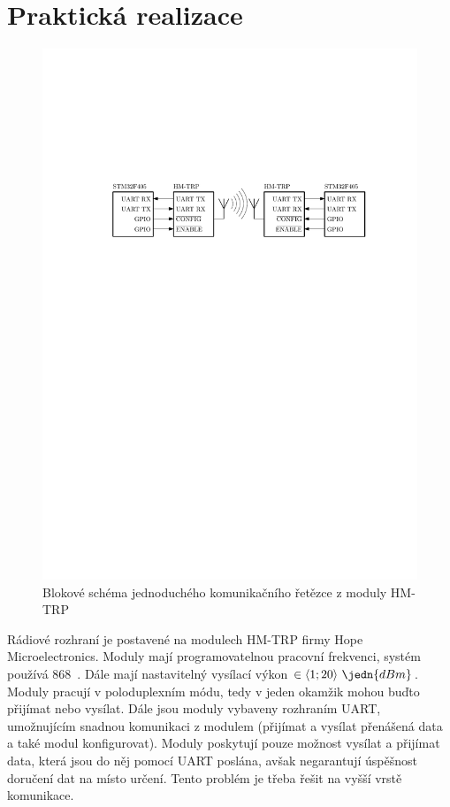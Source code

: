 \section{Praktická realizace}
\begin{figure}[H]
    \begin{center}
        \includegraphics[width=\textwidth]{img/hm-trp}
    \end{center}
    \caption{Blokové schéma jednoduchého komunikačního řetězce z moduly HM-TRP}
\end{figure}
Rádiové rozhraní je postavené na modulech HM-TRP firmy Hope Microelectronics. Moduly mají programovatelnou pracovní frekvenci, systém používá 868~. Dále mají nastavitelný vysílací výkon $\in \langle 1; 20 \rangle~\jedn{dBm}$. Moduly pracují v poloduplexním módu, tedy v jeden okamžik mohou buďto přijímat nebo vysílat. Dále jsou moduly vybaveny rozhraním UART, umožnujícím snadnou komunikaci z modulem (přijímat a vysílat přenášená data a také modul konfigurovat). Moduly poskytují pouze možnost vysílat a přijímat data, která jsou do něj pomocí UART poslána, avšak negarantují úspěšnost doručení dat na místo určení. Tento problém je třeba řešit na vyšší vrstě komunikace.
